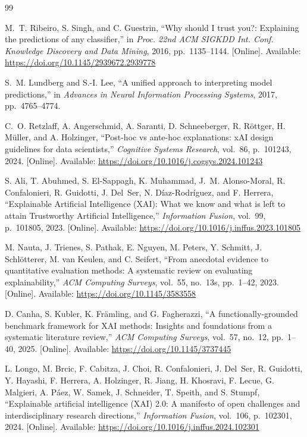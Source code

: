 \documentclass{cleiej}
\begin{document}
\begin{thebibliography}{99}

M.~T. Ribeiro, S. Singh, and C. Guestrin, ``Why should I trust you?:
Explaining the predictions of any classifier,'' in \emph{Proc. 22nd ACM
SIGKDD Int. Conf. Knowledge Discovery and Data Mining}, 2016,
pp.~1135--1144. [Online]. Available:
\url{https://doi.org/10.1145/2939672.2939778}

S.~M. Lundberg and S.-I. Lee, ``A unified approach to interpreting model
predictions,'' in \emph{Advances in Neural Information Processing Systems},
2017, pp.~4765--4774.

C.~O. Retzlaff, A. Angerschmid, A. Saranti, D. Schneeberger, R. R\"{o}ttger,
H. M\"{u}ller, and A. Holzinger, ``Post-hoc vs ante-hoc explanations: xAI
design guidelines for data scientists,'' \emph{Cognitive Systems Research},
vol.~86, p.~101243, 2024. [Online]. Available:
\url{https://doi.org/10.1016/j.cogsys.2024.101243}

S. Ali, T. Abuhmed, S. El-Sappagh, K. Muhammad, J.~M. Alonso-Moral,
R. Confalonieri, R. Guidotti, J. Del~Ser, N. D\'{i}az-Rodr\'{i}guez, and
F. Herrera, ``Explainable Artificial Intelligence (XAI): What we know and
what is left to attain Trustworthy Artificial Intelligence,''
\emph{Information Fusion}, vol.~99, p.~101805, 2023. [Online]. Available:
\url{https://doi.org/10.1016/j.inffus.2023.101805}

M. Nauta, J. Trienes, S. Pathak, E. Nguyen, M. Peters, Y. Schmitt,
J. Schl\"{o}tterer, M. van Keulen, and C. Seifert, ``From anecdotal evidence
to quantitative evaluation methods: A systematic review on evaluating
explainability,'' \emph{ACM Computing Surveys}, vol.~55, no.~13s,
pp.~1--42, 2023. [Online]. Available:
\url{https://doi.org/10.1145/3583558}

D. Canha, S. Kubler, K. Fr\"{a}mling, and G. Fagherazzi, ``A
functionally-grounded benchmark framework for XAI methods: Insights and
foundations from a systematic literature review,'' \emph{ACM Computing
Surveys}, vol.~57, no.~12, pp.~1--40, 2025. [Online]. Available:
\url{https://doi.org/10.1145/3737445}

L. Longo, M. Brcic, F. Cabitza, J. Choi, R. Confalonieri, J. Del~Ser,
R. Guidotti, Y. Hayashi, F. Herrera, A. Holzinger, R. Jiang, H. Khosravi,
F. Lecue, G. Malgieri, A. P\'{a}ez, W. Samek, J. Schneider, T. Speith, and
S. Stumpf, ``Explainable artificial intelligence (XAI) 2.0: A manifesto of
open challenges and interdisciplinary research directions,''
\emph{Information Fusion}, vol.~106, p.~102301, 2024. [Online]. Available:
\url{https://doi.org/10.1016/j.inffus.2024.102301}


\end{thebibliography}
\end{document}
